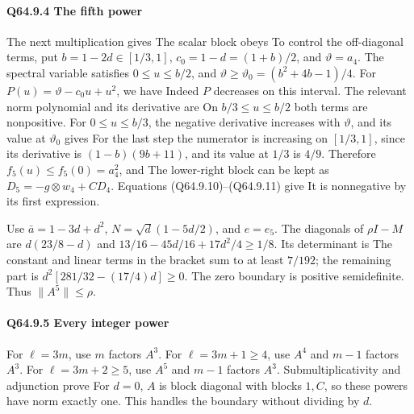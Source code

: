 \paragraph{Q64.9.4 The fifth power}

The next multiplication gives
The scalar block obeys
To control the off-diagonal terms, put
\(b=1-2d\in[1/3,\allowbreak  1]\), \(c_0=1-d=(1+b)/2\), and
\(\vartheta=a_4\). The spectral variable satisfies \(0\le u\le b/2\),
and \(\vartheta\ge\vartheta_0=(b^2+4b-1)/4\).
For \(P(u)=\vartheta-c_0u+u^2\), we have
Indeed \(P\) decreases on this interval. The relevant norm polynomial
and its derivative are
On \(b/3\le u\le b/2\) both terms are nonpositive.
For \(0\le u\le b/3\), the negative derivative increases with
\(\vartheta\), and its value at \(\vartheta_0\) gives
For the last step the numerator is increasing on \([1/3,\allowbreak  1]\), since
its derivative is \((1-b)(9b+11)\), and its value at \(1/3\) is
\(4/9\). Therefore \(f_5(u)\le f_5(0)=a_4^2\), and
The lower-right block can be kept as
\(D_5=-g\otimes w_4+CD_4\). Equations (Q64.9.10)--(Q64.9.11) give
It is nonnegative by its first expression.

Use \(\bar a=1-3d+d^2\),
\(N=\sqrt d(1-5d/2)\), and \(e=e_5\).
The diagonals of \(\rho I-M\) are
\(d(23/8-d)\) and \(13/16-45d/16+17d^2/4\ge1/8\).
Its determinant is
The constant and linear terms in the bracket sum to at least \(7/192\);
the remaining part is
\(d^2[281/32-(17/4)d]\ge0\). The zero boundary is positive
semidefinite. Thus \(\|A^5\|\le\rho\).

\paragraph{Q64.9.5 Every integer power}

For \(\ell=3m\), use \(m\) factors \(A^3\).
For \(\ell=3m+1\ge4\), use \(A^4\) and \(m-1\) factors \(A^3\).
For \(\ell=3m+2\ge5\), use \(A^5\) and \(m-1\) factors \(A^3\).
Submultiplicativity and adjunction prove
For \(d=0\), \(A\) is block diagonal with blocks \(1,\allowbreak  C\), so these
powers have norm exactly one. This handles the boundary without
dividing by \(d\).
